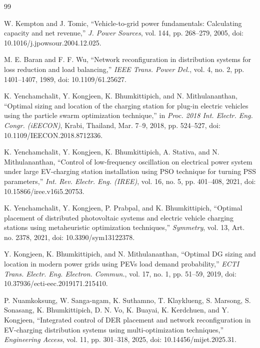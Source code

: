 \begin{thebibliography}{99}

W. Kempton and J. Tomic,
``Vehicle-to-grid power fundamentals: Calculating capacity and net revenue,''
\emph{J. Power Sources}, vol. 144, pp. 268--279, 2005,
doi: 10.1016/j.jpowsour.2004.12.025.

M. E. Baran and F. F. Wu,
``Network reconfiguration in distribution systems for loss reduction
and load balancing,''
\emph{IEEE Trans. Power Del.}, vol. 4, no. 2, pp. 1401--1407, 1989,
doi: 10.1109/61.25627.

K. Yenchamchalit, Y. Kongjeen, K. Bhumkittipich,
and N. Mithulananthan,
``Optimal sizing and location of the charging station for plug-in
electric vehicles using the particle swarm optimization technique,''
in \emph{Proc. 2018 Int. Electr. Eng. Congr. (iEECON)},
Krabi, Thailand, Mar. 7--9, 2018, pp. 524--527,
doi: 10.1109/IEECON.2018.8712336.

K. Yenchamchalit, Y. Kongjeen, K. Bhumkittipich, A. Stativa,
and N. Mithulananthan,
``Control of low-frequency oscillation on electrical power system
under large EV-charging station installation using PSO technique
for turning PSS parameters,''
\emph{Int. Rev. Electr. Eng. (IREE)},
vol. 16, no. 5, pp. 401--408, 2021,
doi: 10.15866/iree.v16i5.20753.

K. Yenchamchalit, Y. Kongjeen, P. Prabpal, and K. Bhumkittipich,
``Optimal placement of distributed photovoltaic systems and electric
vehicle charging stations using metaheuristic optimization techniques,''
\emph{Symmetry}, vol. 13, Art. no. 2378, 2021,
doi: 10.3390/sym13122378.

Y. Kongjeen, K. Bhumkittipich, and N. Mithulananthan,
``Optimal DG sizing and location in modern power grids using PEVs
load demand probability,''
\emph{ECTI Trans. Electr. Eng. Electron. Commun.},
vol. 17, no. 1, pp. 51--59, 2019,
doi: 10.37936/ecti-eec.2019171.215410.

P. Nuamkoksung, W. Sanga-ngam, K. Suthamno, T. Klayklueng,
S. Marsong, S. Sonasang, K. Bhumkittipich, D. N. Vo, K. Buayai,
K. Kerdchuen, and Y. Kongjeen,
``Integrated control of DER placement and network reconfiguration in
EV-charging distribution systems using multi-optimization techniques,''
\emph{Engineering Access}, vol. 11, pp. 301--318, 2025,
doi: 10.14456/mijet.2025.31.


\end{thebibliography}
